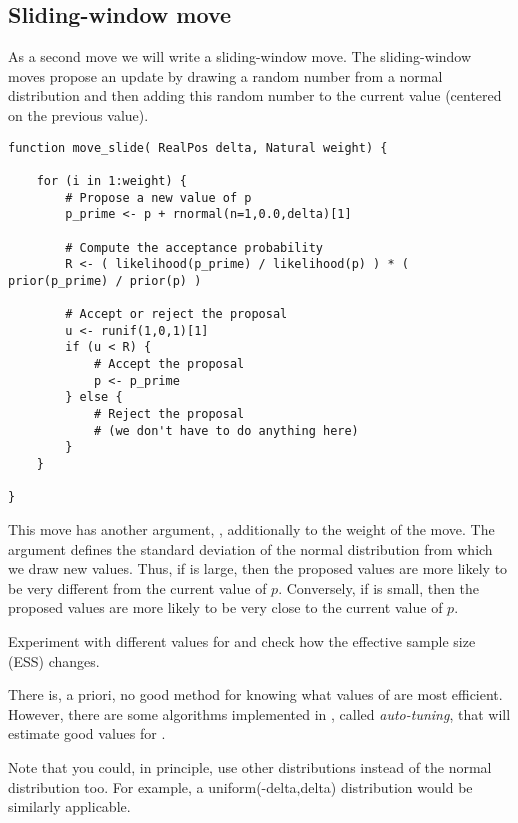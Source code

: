 \subsection{Sliding-window move}
As a second move we will write a sliding-window move.
The sliding-window moves propose an update by drawing a random number from a normal distribution and then adding this random number to the current value (\IE centered on the previous value).
{\tt \begin{snugshade*}
\begin{lstlisting}    
function move_slide( RealPos delta, Natural weight) {

    for (i in 1:weight) {
        # Propose a new value of p
        p_prime <- p + rnormal(n=1,0.0,delta)[1]

        # Compute the acceptance probability
        R <- ( likelihood(p_prime) / likelihood(p) ) * ( prior(p_prime) / prior(p) )
    
        # Accept or reject the proposal
        u <- runif(1,0,1)[1]
        if (u < R) {
            # Accept the proposal
            p <- p_prime
        } else {
            # Reject the proposal
            # (we don't have to do anything here)
        }
    }
    
}
\end{lstlisting}
\end{snugshade*}}
This move has another argument, , additionally to the weight of the move.
The argument  defines the standard deviation of the normal distribution from which we draw new values.
Thus, if  is large, then the proposed values are more likely to be very different from the current value of $p$.
Conversely, if  is small, then the proposed values are more likely to be very close to the current value of $p$.

\impmark Experiment with different values for  and check how the effective sample size (ESS) changes.

There is, a priori, no good method for knowing what values of  are most efficient.
However, there are some algorithms implemented in \RevBayes, called \emph{auto-tuning}, that will estimate good values for .


\begin{framed}
Note that you could, in principle, use other distributions instead of the normal distribution too. For example, a uniform(-delta,delta) distribution would be similarly applicable.
\end{framed}


